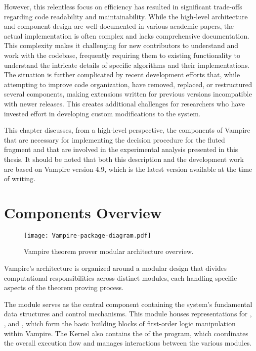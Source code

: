 However, this relentless focus on efficiency has resulted in significant trade-offs regarding code readability and maintainability.
While the high-level architecture and component design are well-documented in various academic papers, the actual implementation is often complex and lacks comprehensive documentation.
This complexity makes it challenging for new contributors to understand and work with the codebase, frequently requiring them to  existing functionality to understand the intricate details of specific algorithms and their implementations.
The situation is further complicated by recent development efforts that, while attempting to improve code organization, have removed, replaced, or restructured several components, making extensions written for previous versions incompatible with newer releases.
This creates additional challenges for researchers who have invested effort in developing custom modifications to the system.

This chapter discusses, from a high-level perspective, the components of Vampire that are necessary for implementing the decision procedure for the fluted fragment and that are involved in the experimental analysis presented in this thesis.
It should be noted that both this description and the development work are based on Vampire version 4.9, which is the latest version available at the time of writing.

\section{Components Overview}\label{sec:components-overview}

\begin{figure}[htbp]
  \centering
  \texttt{[image: Vampire-package-diagram.pdf]}
  \caption{Vampire theorem prover modular architecture overview.}\label{fig:vampire-architecture}
\end{figure}

Vampire's architecture is organized around a modular design that divides computational responsibilities across distinct modules, each handling specific aspects of the theorem proving process.

The  module serves as the central component containing the system's fundamental data structures and control mechanisms.
This module houses representations for , , and , which form the basic building blocks of first-order logic manipulation within Vampire.
The Kernel also contains the  of the program, which coordinates the overall execution flow and manages interactions between the various modules.

